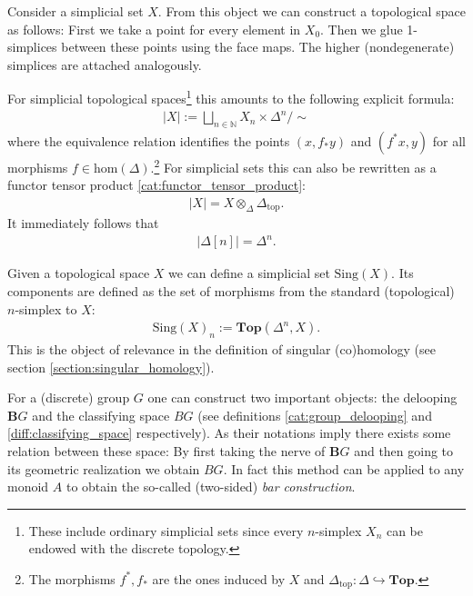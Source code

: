    \begin{example}\label{model:geometric_realization}
        Consider a simplicial set $X$. From this object we can construct a topological space as follows: First we take a point for every element in $X_0$. Then we glue 1-simplices between these points using the face maps. The higher (nondegenerate) simplices are attached analogously.

        For simplicial topological spaces\footnote{These include ordinary simplicial sets since every $n$-simplex $X_n$ can be endowed with the discrete topology.} this amounts to the following explicit formula:
        \begin{gather}
            |X| := \bigsqcup_{n\in\mathbb{N}}X_n\times\Delta^n / \sim
        \end{gather}
        where the equivalence relation identifies the points $(x,f_*y)$ and $(f^*x,y)$ for all morphisms $f\in\text{hom}(\Delta)$.\footnote{The morphisms $f^*, f_*$ are the ones induced by $X$ and $\Delta_{\text{top}}:\Delta\hookrightarrow\mathbf{Top}$.} For simplicial sets this can also be rewritten as a functor tensor product \ref{cat:functor_tensor_product}:
        \begin{gather}
            |X| = X\otimes_{\Delta}\Delta_{\text{top}}.
        \end{gather}
        It immediately follows that
        \begin{gather}
            |\Delta[n]| = \Delta^n.
        \end{gather}
    \end{example}
    \begin{example}\label{model:singular_set}
        Given a topological space $X$ we can define a simplicial set $\text{Sing}(X)$. Its components are defined as the set of morphisms from the standard (topological) $n$-simplex to $X$:
        \begin{gather}
            \text{Sing}(X)_n := \mathbf{Top}(\Delta^n, X).
        \end{gather}
        This is the object of relevance in the definition of singular (co)homology (see section \ref{section:singular_homology}).
    \end{example}

    \begin{property}
        For a (discrete) group $G$ one can construct two important objects: the delooping $\mathbf{B}G$ and the classifying space $BG$ (see definitions \ref{cat:group_delooping} and \ref{diff:classifying_space} respectively). As their notations imply there exists some relation between these space: By first taking the nerve of $\mathbf{B}G$ and then going to its geometric realization we obtain $BG$. In fact this method can be applied to any monoid $A$ to obtain the so-called (two-sided) \textit{bar construction}.
    \end{property}

